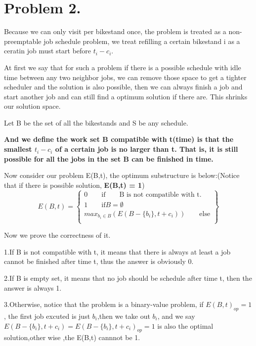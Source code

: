 \documentclass[oneside]{homework} %
\begin{document}
\maketitle
\newpage

\section*{Problem 2.} 
Because we can only visit per bikestand once, the problem is treated as a non-preemptable job schedule problem, we treat refilling a certain bikestand i as a ceratin job must start before $t_{i} - c_{i}$.

At first we say that for such a  problem if there is a possible schedule with idle time between any two neighbor jobs, we can remove those space to get a tighter scheduler and the solution is also possible, then we can always finish a job and start another job and can still find a optimum solution if there are. This shrinks our solution space.

Let B be the set of all the bikestands and S be any schedule.

{\bfseries 
  And we define the work set B compatible with t(time) is that the smallest $t_{i} - c_{i}$ of a certain job is  no larger than t. That is, it is still possible for all the jobs in the set B can be finished in time.
}

Now consider our problem E(B,t), the optimum substructure is below:(Notice that if there is possible solution, \textbf{E(B,t) = 1})
\begin{equation*}
  E(B,t) = \left \{
	\begin{array}{l}
	  {0} \qquad \text{if} \qquad \text{B is not compatible with t.}  \\
	  {1} \qquad \text{if}  B = \emptyset   \\
	  { max_{b_{i}\in B}(E(B-\{b_{i}\},t+c_{i}))} \qquad \text{else}  \\
	\end{array}
  \right \}
\end{equation*}

Now we prove the correctness of it.

1.If B is not compatible with t, it means that there is always at least a job cannot be finished after time t, thus the answer is obviously 0. 

2.If B is empty set, it means that no job should be schedule after time t, then the answer is always 1.

3.Otherwise, notice that the problem is a binary-value problem, if $E(B,t)_{op}=1$, the first job excuted is just $b_{i}$,then we take out $b_{i}$, and we say $E(B-\{b_{i}\},t+c_{i}) = E(B-\{b_{i}\},t+c_{i})_{op} = 1$ is also the optimal solution,other wise ,the E(B,t) cannnot be 1. 
\end{document}
